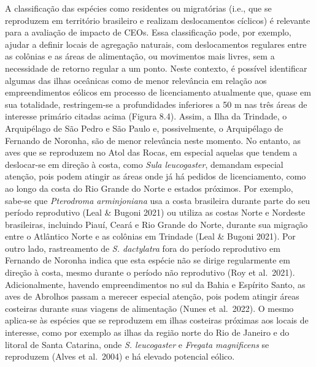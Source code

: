 \documentclass[
  oneside]{scrbook}
\begin{document}
A classificação das espécies como residentes ou migratórias (i.e., que se reproduzem em território brasileiro e realizam deslocamentos cíclicos) é relevante para a avaliação de impacto de CEOs. Essa classificação pode, por exemplo, ajudar a definir locais de agregação naturais, com deslocamentos regulares entre as colônias e as áreas de alimentação, ou movimentos mais livres, sem a necessidade de retorno regular a um ponto. Neste contexto, é possível identificar algumas das ilhas oceânicas como de menor relevância em relação aos empreendimentos eólicos em processo de licenciamento atualmente que, quase em sua totalidade, restringem-se a profundidades inferiores a 50 m nas três áreas de interesse primário citadas acima (Figura 8.4). Assim, a Ilha da Trindade, o Arquipélago de São Pedro e São Paulo e, possivelmente, o Arquipélago de Fernando de Noronha, são de menor relevância neste momento. No entanto, as aves que se reproduzem no Atol das Rocas, em especial aquelas que tendem a deslocar-se em direção à costa, como \emph{Sula leucogaster}, demandam especial atenção, pois podem atingir as áreas onde já há pedidos de licenciamento, como ao longo da costa do Rio Grande do Norte e estados próximos. Por exemplo, sabe-se que \emph{Pterodroma arminjoniana} usa a costa brasileira durante parte do seu período reprodutivo (Leal \& Bugoni 2021) ou utiliza as costas Norte e Nordeste brasileiras, incluindo Piauí, Ceará e Rio Grande do Norte, durante sua migração entre o Atlântico Norte e as colônias em Trindade (Leal \& Bugoni 2021). Por outro lado, rastreamento de \emph{S. dactylatra} fora do período reprodutivo em Fernando de Noronha indica que esta espécie não se dirige regularmente em direção à costa, mesmo durante o período não reprodutivo (Roy et al.~2021). Adicionalmente, havendo empreendimentos no sul da Bahia e Espírito Santo, as aves de Abrolhos passam a merecer especial atenção, pois podem atingir áreas costeiras durante suas viagens de alimentação (Nunes et al.~2022). O mesmo aplica-se às espécies que se reproduzem em ilhas costeiras próximas aos locais de interesse, como por exemplo as ilhas da região norte do Rio de Janeiro e do litoral de Santa Catarina, onde \emph{S. leucogaster} e \emph{Fregata magnificens} se reproduzem (Alves et al.~2004) e há elevado potencial eólico.
\end{document}
